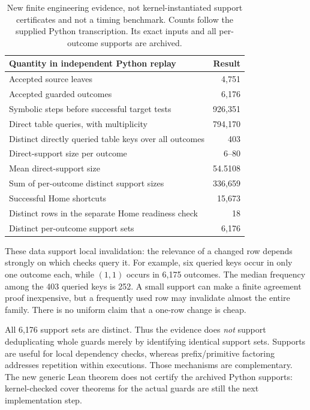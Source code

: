 \documentclass[11pt]{article}
\theoremstyle{definition}\newtheorem{definition}[theorem]{Definition}
\begin{document}
\begin{table}[h]
\centering
\begin{tabular}{@{}lr@{}}
\toprule
Quantity in independent Python replay & Result\\
\midrule
Accepted source leaves & 4,751\\
Accepted guarded outcomes & 6,176\\
Symbolic steps before successful target tests & 926,351\\
Direct table queries, with multiplicity & 794,170\\
Distinct directly queried table keys over all outcomes & 403\\
Direct-support size per outcome & 6--80\\
Mean direct-support size & 54.5108\\
Sum of per-outcome distinct support sizes & 336,659\\
Successful Home shortcuts & 15,673\\
Distinct rows in the separate Home readiness check & 18\\
Distinct per-outcome support sets & 6,176\\
\bottomrule
\end{tabular}
\caption{New finite engineering evidence, not kernel-instantiated support
certificates and not a timing benchmark. Counts follow the supplied Python
transcription. Its exact inputs and all per-outcome supports are archived.}
\end{table}

These data support local invalidation: the relevance of a changed row depends
strongly on which checks query it. For example, six queried keys occur in only
one outcome each, while $(1,1)$ occurs in 6,175 outcomes. The median frequency
among the 403 queried keys is 252. A small support can make a finite agreement
proof inexpensive, but a frequently used row may invalidate almost the entire
family. There is no uniform claim that a one-row change is cheap.

All 6,176 support sets are distinct. Thus the evidence does \emph{not} support
deduplicating whole guards merely by identifying identical support sets.
Supports are useful for local dependency checks, whereas prefix/primitive
factoring addresses repetition within executions. Those mechanisms are
complementary. The new generic Lean theorem does not certify the archived
Python supports: kernel-checked cover theorems for the actual guards are still
the next implementation step.
\end{document}
